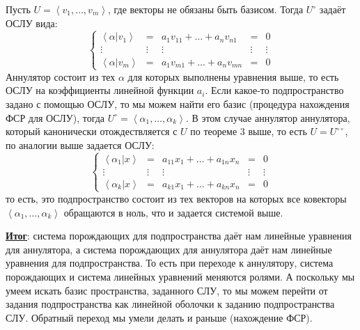 \documentclass[12pt]{article}
\theoremstyle{definition}
\newcommand{\linsp}[1]{\left\langle #1 \right\rangle }
\newcommand{\linmer}[2]{\left\langle #1 \vert #2\right\rangle }
\begin{document}
Пусть $U = \linsp{v_1, \dotsc,v_m}$, где векторы не обязаны быть базисом. Тогда $U^{\circ}$ задаёт ОСЛУ вида:
$$
	\left\{
	\begin{array}{ccccc}
		\linmer{\alpha}{v_1} & = & a_1 v_{11} + \dotsc + a_n v_{n1}  & = & 0 \\
		\vdots & \vdots & \vdots & \vdots & \vdots\\
		\linmer{\alpha}{v_m} & = & a_1 v_{m1} + \dotsc + a_n v_{mn} & = & 0
	\end{array}
	\right.
$$
Аннулятор состоит из тех $\alpha$ для которых выполнены уравнения выше, то есть ОСЛУ на коэффициенты линейной функции $a_i$. Если какое-то подпространство задано с помощью ОСЛУ, то мы можем найти его базис (процедура нахождения ФСР для ОСЛУ), тогда $U^{\circ} = \linsp{\alpha_1,\dotsc,\alpha_k}$. В этом случае аннулятор аннулятора, который канонически отождествляется с $U$ по теореме $3$ выше, то есть $U = U^{\circ\circ}$, по аналогии выше задается ОСЛУ:
$$
	\left\{
	\begin{array}{ccccc}
		\linmer{\alpha_1}{x} & = & a_{11} x_{1} + \dotsc + a_{1n} x_{n}  & = & 0 \\
		\vdots & \vdots & \vdots & \vdots & \vdots\\
		\linmer{\alpha_k}{x} & = & a_{k1} x_{1} + \dotsc + a_{kn} x_{n} & = & 0
	\end{array}
	\right.
$$
то есть, это подпространство состоит из тех векторов на которых все ковекторы $\linsp{\alpha_1,\dotsc,\alpha_k}$ обращаются в ноль, что и задается системой выше.

\textbf{\uline{Итог}}: система порождающих для подпространства даёт нам линейные уравнения для аннулятора, а система порождающих для аннулятора даёт нам линейные уравнения для подпространства. То есть при переходе к аннулятору, система порождающих и система линейных уравнений меняются ролями. А поскольку мы умеем искать базис пространства, заданного СЛУ, то мы можем перейти от задания подпространства как линейной оболочки к заданию подпространства СЛУ. Обратный переход мы умели делать и раньше (нахождение ФСР).
\end{document}
